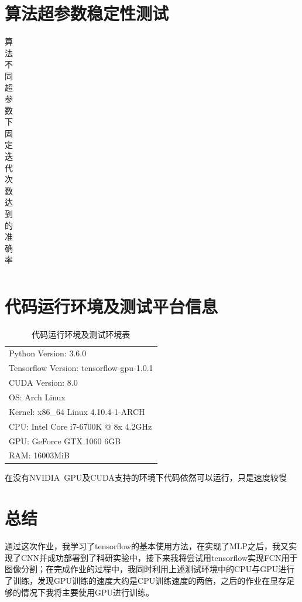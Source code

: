 \documentclass[a4paper, UTF8]{ctexrep}
\begin{document}
		\section{算法超参数稳定性测试}
			\begin{table}[htbp!]
				\centering
				\begin{tabular}{cccc}

				\end{tabular}
				\caption{算法不同超参数下固定迭代次数达到的准确率}
			\end{table}


    \section{代码运行环境及测试平台信息}
      \begin{table}[htbp!]
        \centering
        \begin{tabular}{l}
          \hline
          Python Version: 3.6.0 \\
          Tensorflow Version: tensorflow-gpu-1.0.1 \\
          CUDA Version: 8.0 \\
          OS: Arch Linux \\
          Kernel: x86\_64 Linux 4.10.4-1-ARCH \\
          CPU: Intel Core i7-6700K @ 8x 4.2GHz \\
          GPU: GeForce GTX 1060 6GB \\
          RAM: 16003MiB \\
          \hline
        \end{tabular}
        \caption{代码运行环境及测试环境表}
      \end{table}
      在没有NVIDIA\ GPU及CUDA支持的环境下代码依然可以运行，只是速度较慢
    \section{总结}
      通过这次作业，我学习了tensorflow的基本使用方法，在实现了MLP之后，我又实现了CNN并成功部署到了科研实验中，接下来我将尝试用tensorflow实现FCN用于图像分割；在完成作业的过程中，我同时利用上述测试环境中的CPU与GPU进行了训练，发现GPU训练的速度大约是CPU训练速度的两倍，之后的作业在显存足够的情况下我将主要使用GPU进行训练。
\end{document}
